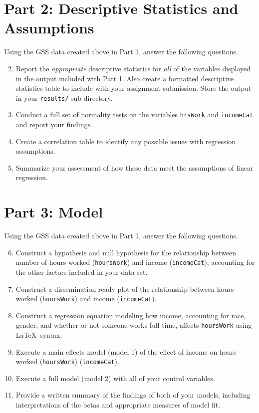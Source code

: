 \documentclass{tufte-handout}
\begin{document}
\vspace{5mm}
\section{Part 2: Descriptive Statistics and Assumptions}
Using the GSS data created above in Part 1, answer the following questions. 
\begin{enumerate}
\setcounter{enumi}{1}
\item Report the \textit{appropriate} descriptive statistics for \textit{all} of the variables displayed in the output included with Part 1. Also create a formatted descriptive statistics table to include with your assignment submission. Store the output in your \texttt{results/} sub-directory.
\item Conduct a full set of normality tests on the variables \texttt{hrsWork} and \texttt{incomeCat} and report your findings.
\item Create a correlation table to identify any possible issues with regression assumptions.
\item Summarize your assessment of how these data meet the assumptions of linear regression.
\end{enumerate}

\vspace{5mm}
\section{Part 3: Model}
Using the GSS data created above in Part 1, answer the following questions.
\begin{enumerate}
\setcounter{enumi}{5}
\item Construct a hypothesis and null hypothesis for the relationship between number of hours worked (\texttt{hoursWork}) and income (\texttt{incomeCat}), accounting for the other factors included in your data set.
\item Construct a dissemination ready plot of the relationship between hours worked (\texttt{hoursWork}) and income (\texttt{incomeCat}). 
\item Construct a regression equation modeling how income, accounting for race, gender, and whether or not someone works full time, affects \texttt{hoursWork} using \LaTeX{}\ syntax. 
\item Execute a main effects model (model 1) of the effect of income on hours worked (\texttt{hoursWork}) (\texttt{incomeCat}).
\item Execute a full model  (model 2) with all of your control variables.
\item Provide a written summary of the findings of both of your models, including interpretations of the betas and appropriate measures of model fit.
\end{enumerate}
\end{document}
